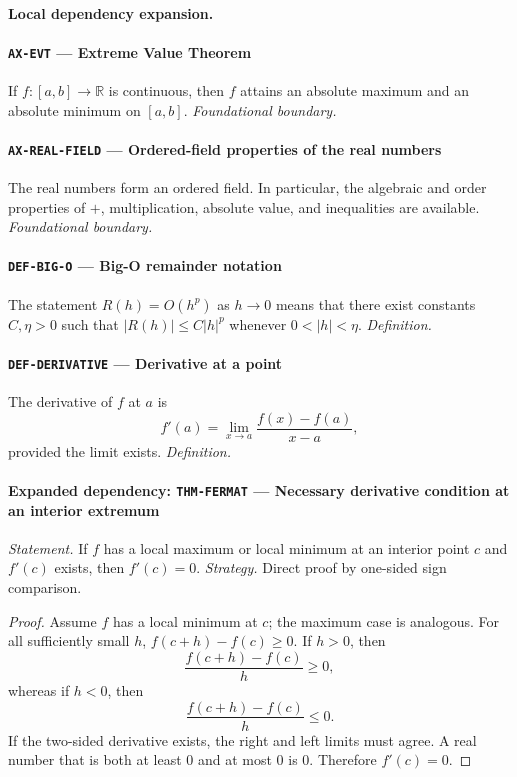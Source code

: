 \documentclass[10pt]{article}
\newcommand{\pidraw}[1]{\begingroup\urlstyle{tt}\nolinkurl{#1}\endgroup}
\theoremstyle{definition}
\theoremstyle{remark}
\begin{document}
\paragraph{Local dependency expansion.}

\paragraph{\pidraw{AX-EVT} --- Extreme Value Theorem}
If $f:[a,b]\to\mathbb{R}$ is continuous, then $f$ attains an absolute maximum and an absolute minimum on $[a,b]$.
\textit{Foundational boundary.}

\paragraph{\pidraw{AX-REAL-FIELD} --- Ordered-field properties of the real numbers}
The real numbers form an ordered field. In particular, the algebraic and order properties of $+$, multiplication, absolute value, and inequalities are available.
\textit{Foundational boundary.}

\paragraph{\pidraw{DEF-BIG-O} --- Big-O remainder notation}
The statement $R(h)=O(h^p)$ as $h\to0$ means that there exist constants $C,\eta>0$ such that $|R(h)|\le C|h|^p$ whenever $0<|h|<\eta$.
\textit{Definition.}

\paragraph{\pidraw{DEF-DERIVATIVE} --- Derivative at a point}
The derivative of $f$ at $a$ is
\[
f'(a)=\lim_{x\to a}\frac{f(x)-f(a)}{x-a},
\]
provided the limit exists.
\textit{Definition.}

\paragraph{Expanded dependency: \pidraw{THM-FERMAT} --- Necessary derivative condition at an interior extremum}
\textit{Statement.} If $f$ has a local maximum or local minimum at an interior point $c$ and $f'(c)$ exists, then $f'(c)=0$.
\textit{Strategy.} Direct proof by one-sided sign comparison.
\begin{proof}Assume $f$ has a local minimum at $c$; the maximum case is analogous.
For all sufficiently small $h$,
$f(c+h)-f(c)\ge0$. If $h>0$, then
\[
\frac{f(c+h)-f(c)}{h}\ge0,
\]
whereas if $h<0$, then
\[
\frac{f(c+h)-f(c)}{h}\le0.
\]
If the two-sided derivative exists, the right and left limits must agree.
A real number that is both at least $0$ and at most $0$ is $0$.
Therefore $f'(c)=0$.\end{proof}
\end{document}
